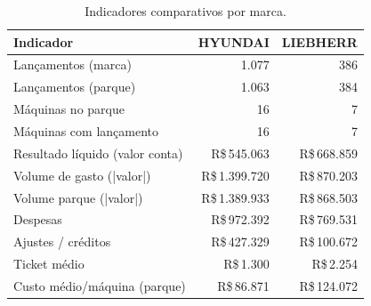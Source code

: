 \begin{table}[H]
\centering
\small
\begin{tabular}{lrr}
\toprule
Indicador & HYUNDAI & LIEBHERR \\
\midrule
Lançamentos (marca) & 1.077 & 386 \\
Lançamentos (parque) & 1.063 & 384 \\
Máquinas no parque & 16 & 7 \\
Máquinas com lançamento & 16 & 7 \\
Resultado líquido (valor conta) & R\$\,545.063 & R\$\,668.859 \\
Volume de gasto (|valor|) & R\$\,1.399.720 & R\$\,870.203 \\
Volume parque (|valor|) & R\$\,1.389.933 & R\$\,868.503 \\
Despesas & R\$\,972.392 & R\$\,769.531 \\
Ajustes / créditos & R\$\,427.329 & R\$\,100.672 \\
Ticket médio & R\$\,1.300 & R\$\,2.254 \\
Custo médio/máquina (parque) & R\$\,86.871 & R\$\,124.072 \\
\bottomrule
\end{tabular}
\caption{Indicadores comparativos por marca.}
\end{table}
